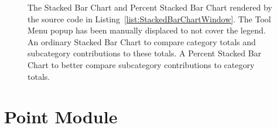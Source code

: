 \begin{figure}[tp]
\centering
{}
\hspace{1cm}
\caption[Stacked Bar Chart Window Example]{%
The Stacked Bar Chart and Percent Stacked Bar Chart rendered by the source
code in Listing~\ref{list:StackedBarChartWindow}. The Tool Menu popup has
been manually displaced to not cover the legend.
 An ordinary Stacked Bar Chart to
compare category totals and subcategory contributions to these totals.
 A Percent Stacked Bar Chart to
better compare subcategory contributions to category totals.
}
\label{fig:StackedBarChartWindow}
\end{figure}
  







\section{Point Module}

